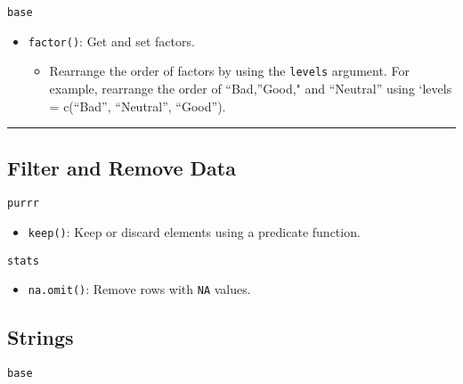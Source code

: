 \documentclass[]{book}
\providecommand{\tightlist}{%
  \setlength{\itemsep}{0pt}\setlength{\parskip}{0pt}}
\theoremstyle{definition}
\theoremstyle{definition}
\theoremstyle{definition}
\theoremstyle{remark}
\begin{document}
\texttt{base}

\begin{itemize}
\tightlist
\item
  \texttt{factor()}: Get and set factors.

  \begin{itemize}
  \tightlist
  \item
    Rearrange the order of factors by using the \texttt{levels}
    argument. For example, rearrange the order of ``Bad,''Good," and
    ``Neutral'' using `levels = c(``Bad'', ``Neutral'', ``Good'').
  \end{itemize}
\end{itemize}

\begin{center}\rule{0.5\linewidth}{\linethickness}\end{center}

\subsection{Filter and Remove Data}\label{filter-and-remove-data}

\texttt{purrr}

\begin{itemize}
\tightlist
\item
  \texttt{keep()}: Keep or discard elements using a predicate function.
\end{itemize}

\texttt{stats}

\begin{itemize}
\tightlist
\item
  \texttt{na.omit()}: Remove rows with \texttt{NA} values.
\end{itemize}

\subsection{Strings}\label{strings}

\texttt{base}
\end{document}
